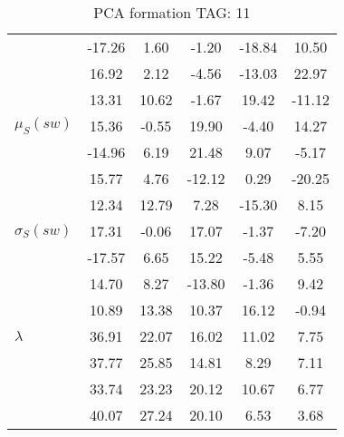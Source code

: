 \begin{table}[h!]
\begin{center}
\begin{tabular}{| l || c | c | c | c | c |}
 & -17.26  & 1.60  & -1.20  & -18.84  & 10.50 \\
 & 16.92  & 2.12  & -4.56  & -13.03  & 22.97 \\
 & 13.31  & 10.62  & -1.67  & 19.42  & -11.12 \\\hline
$\mu_S(sw)$ & 15.36  & -0.55  & 19.90  & -4.40  & 14.27 \\
 & -14.96  & 6.19  & 21.48  & 9.07  & -5.17 \\
 & 15.77  & 4.76  & -12.12  & 0.29  & -20.25 \\
 & 12.34  & 12.79  & 7.28  & -15.30  & 8.15 \\\hline
$\sigma_S(sw)$ & 17.31  & -0.06  & 17.07  & -1.37  & -7.20 \\
 & -17.57  & 6.65  & 15.22  & -5.48  & 5.55 \\
 & 14.70  & 8.27  & -13.80  & -1.36  & 9.42 \\
 & 10.89  & 13.38  & 10.37  & 16.12  & -0.94 \\\hline\hline
$\lambda$ & 36.91  & 22.07  & 16.02  & 11.02  & 7.75 \\
 & 37.77  & 25.85  & 14.81  & 8.29  & 7.11 \\
 & 33.74  & 23.23  & 20.12  & 10.67  & 6.77 \\
 & 40.07  & 27.24  & 20.10  & 6.53  & 3.68 \\\hline
\end{tabular}
\caption{PCA formation TAG: 11}
\end{center}
\end{table}